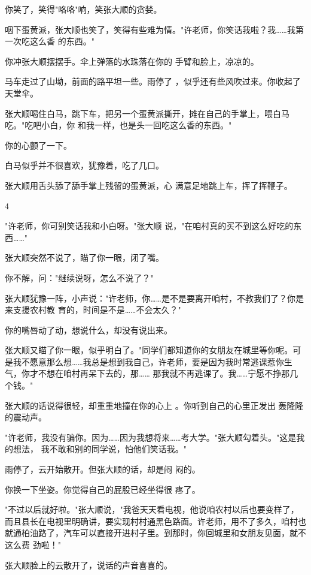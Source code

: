 \documentclass{article}
\begin{document}
你笑了，笑得"咯咯"响，笑张大顺的贪婪。

咽下蛋黄派，张大顺也笑了，笑得有些难为情。"许老师，你笑话我啦？我……我第一次吃这么香
的东西。" 

你冲张大顺摆摆手。伞上弹落的水珠落在你的
手臂和脸上，凉凉的。 

\newpage

马车走过了山坳，前面的路平坦一些。雨停了
，似乎还有些风吹过来。你收起了天堂伞。 

张大顺喝住白马，跳下车，把另一个蛋黄派撕开，摊在自己的手掌上，喂白马吃。"吃吧小白，你
和我一样，也是头一回吃这么香的东西。" 


你的心颤了一下。 


白马似乎并不很喜欢，犹豫着，吃了几口。 

张大顺用舌头舔了舔手掌上残留的蛋黄派，心
满意足地跳上车，挥了挥鞭子。 


4 

"许老师，你可别笑话我和小白呀。"张大顺
说，"在咱村真的买不到这么好吃的东西……" 


张大顺突然不说了，瞄了你一眼，闭了嘴。 

\newpage


你不解，问："继续说呀，怎么不说了？" 

张大顺犹豫一阵，小声说："许老师，你……是不是要离开咱村，不教我们了？你是来支援农村教
育的，时间是不是……不会太久？" 

你的嘴唇动了动，想说什么，却没有说出来。

张大顺又瞄了你一眼，似乎明白了。"同学们都知道你的女朋友在城里等你呢。可是我不愿意那么想……我总是想到我自己，许老师，要是因为我时常逃课惹你生气，你才不想在咱村再呆下去的，那……
那我就不再逃课了。我……宁愿不挣那几个钱。" 

张大顺的话说得很轻，却重重地撞在你的心上
。你听到自己的心里正发出 轰隆隆的震动声。 

"许老师，我没有骗你。因为……因为我想将来……考大学。"张大顺勾着头。"这是我的想法，
我不敢和别的同学说，怕他们笑话我。" 

\newpage

雨停了，云开始散开。但张大顺的话，却是闷
闷的。 

你换一下坐姿。你觉得自己的屁股已经坐得很
疼了。 

"不过以后就好啦。"张大顺说，"我爸天天看电视，他说咱农村以后也要变样了，而且县长在电视里明确讲，要实现村村通黑色路面。许老师，用不了多久，咱村也就通柏油路了，汽车可以直接开进村子里。到那时，你回城里和女朋友见面，就不这么费
劲啦！" 

张大顺脸上的云散开了，说话的声音喜喜的。
\end{document}
